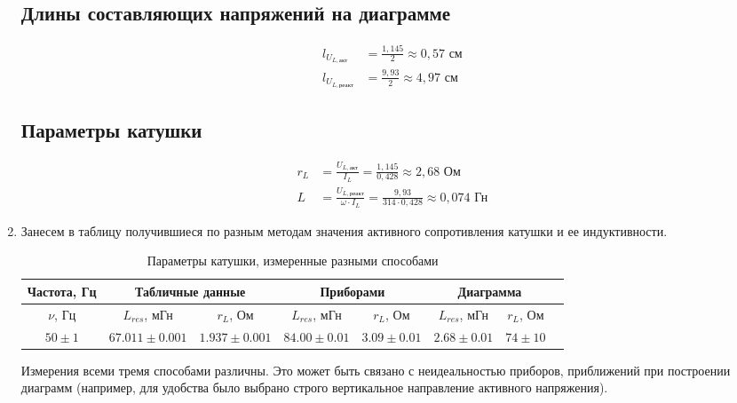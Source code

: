 \documentclass[a4paper, 12pt]{article}
\begin{document}
\begin{enumerate}
    \subsection*{Длины составляющих напряжений на диаграмме}
    \begin{align*}
        l_{U_{L,\text{акт}}} &= \frac{1,145}{2} \approx 0,57\text{ см} \\
        l_{U_{L,\text{реакт}}} &= \frac{9,93}{2} \approx 4,97\text{ см}
    \end{align*}
    \subsection*{Параметры катушки}
    \begin{align*}
        r_L &= \frac{U_{L,\text{акт}}}{I_L} = \frac{1,145}{0,428} \approx 2,68\text{ Ом} \\
        L &= \frac{U_{L,\text{реакт}}}{\omega \cdot I_L} = \frac{9,93}{314 \cdot 0,428} \approx 0,074\text{ Гн}
    \end{align*}
    \newpage
    \item Занесем в таблицу получившиеся по разным методам значения активного сопротивления катушки и ее индуктивности.
    \begin{table}[htbp]
        \centering
        \begin{tabular}{|c|c|c|c|c|c|c|c|}
            \hline
            Частота, Гц & \multicolumn{2}{|c|}{Табличные данные} & \multicolumn{2}{|c|}{Приборами} & \multicolumn{2}{|c|}{Диаграмма}\\
            \hline
            $\nu$, Гц & $L_{res}$, мГн & $r_{L}$, Ом &  $L_{res}$, мГн & $r_{L}$, Ом & $L_{res}$, мГн & $r_{L}$, Ом\\
            $50\pm 1$ & $67.011\pm 0.001$ & $1.937\pm 0.001$ & $84.00\pm 0.01$ & $3.09\pm 0.01$ & $2.68\pm 0.01$ & $74\pm 10$\\
            \hline
        \end{tabular}
        \caption{Параметры катушки, измеренные разными способами}
        \label{Параметры катушки, измеренные разными способами}
    \end{table}\newline
    Измерения всеми тремя способами различны. Это может быть связано с неидеальностью приборов, приближений при построении диаграмм (например, для удобства было выбрано строго вертикальное направление
    активного напряжения).
\end{enumerate}
\end{document}

